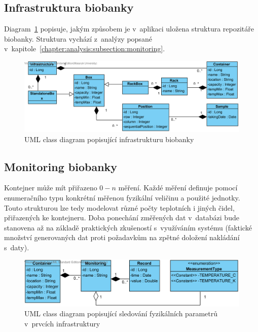 \documentclass[11pt,draft,oneside]{fithesis2}
\begin{document}
\subsection{Infrastruktura biobanky}
Diagram~\ref{fig:index:uml:class:infrastructure} popisuje, jakým způsobem je v~aplikaci uložena struktura repozitáře biobanky. Struktura vychází z~analýzy popsané v~kapitole~\ref{chapter:analysis:subsection:monitoring}.

\begin{figure}[h!]
\begin{center}
	\includegraphics[width=\textwidth]{InfrastructureView}
\caption{UML class diagram popisující infrastrukturu biobanky}
\label{fig:index:uml:class:infrastructure}
\end{center}
\end{figure}

\subsection{Monitoring biobanky}
Kontejner může mít přiřazeno $0-n$ měření. Každé měření definuje pomocí enumeračního typu konkrétní měřenou fyzikální veličinu a použité jednotky. Touto strukturou lze tedy modelovat různé počty teplotních i jiných čidel, přiřazených ke kontejneru. 
Doba ponechání změřených dat v~databázi bude stanovena až na základě praktických zkušeností s~využíváním systému (faktické množství generovaných dat proti požadavkům na zpětné doložení nakládání s~daty).

\begin{figure}[h!]
\begin{center}
	\includegraphics[width=\textwidth]{MonitoringView}
\caption{UML class diagram popisující sledování fyzikálních parametrů v~prvcích infrastruktury}
\label{fig:index:uml:class:monitoring}
\end{center}
\end{figure}
\end{document}
